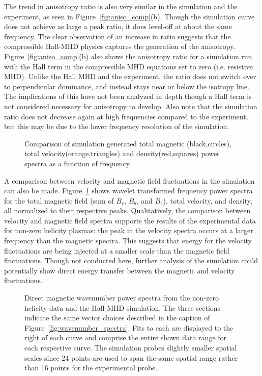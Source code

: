 \documentclass[manuscript]{aastex}
\begin{document}
The trend in anisotropy ratio is also very similar in the simulation and the experiment, as seen in Figure~\ref{fig:aniso_comp}(b). Though the simulation curve does not achieve as large a peak ratio, it does level-off at about the same frequency. The clear observation of an increase in ratio suggests that the compressible Hall-MHD physics captures the generation of the anisotropy. Figure~\ref{fig:aniso_comp}(b) also shows the anisotropy ratio for a simulation run with the Hall term in the compressible MHD equations set to zero (i.e. resistive MHD). Unlike the Hall MHD and the experiment, the ratio does not switch over to perpendicular dominance, and instead stays near or below the isotropy line. The implications of this have not been analyzed in depth though a Hall term is not considered necessary for anisotropy to develop. Also note that the simulation ratio does not decrease again at high frequencies compared to the experiment, but this may be due to the lower frequency resolution of the simulation.

\begin{figure}
\caption{\label{fig:bflow_comp} Comparison of simulation generated total magnetic (black,circles), total velocity(orange,triangles) and density(red,squares) power spectra as a function of frequency.}
\end{figure}

A comparison between velocity and magnetic field fluctuations in the simulation can also be made. Figure~\ref{fig:bflow_comp} shows wavelet transformed frequency power spectra for the total magnetic field (sum of $B_{r}$, $B_{\theta}$, and $B_{z}$), total velocity, and density, all normalized to their respective peaks. Qualitatively, the comparison between velocity and magnetic field spectra supports the results of the experimental data for non-zero helicity plasmas: the peak in the velocity spectra occurs at a larger frequency than the magnetic spectra. This suggests that energy for the velocity fluctuations are being injected at a smaller scale than the magnetic field fluctuations. Though not conducted here, further analysis of the simulation could potentially show direct energy transfer between the magnetic and velocity fluctuations.

\begin{figure}
\caption{\label{fig:sim_wavenumber_comp} Direct magnetic wavenumber power spectra from the non-zero helicity data and the Hall-MHD simulation. The three sections indicate the same vector choices described in the caption of Figure~\ref{fig:wavenumber_spectra}. Fits to each are displayed to the right of each curve and comprise the entire shown data range for each respective curve. The simulation probes slightly smaller spatial scales since 24 points are used to span the same spatial range rather than 16 points for the experimental probe.}
\end{figure}
\end{document}
